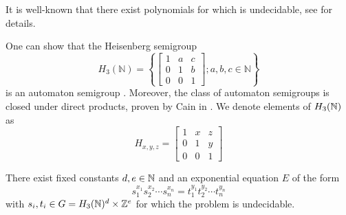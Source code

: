 \documentclass[11pt, titlepage]{article}
\begin{document}
It is well-known that there exist polynomials for which
 is undecidable, see \cite{Matiyasevich:hilbert} for
details.

One can show that the Heisenberg semigroup
\[
  H_3(\mathbb{N}) = \left\{
      \begin{bmatrix}
        1 & a & c \\
        0 & 1 & b \\
        0 & 0 & 1
      \end{bmatrix}; a, b, c \in \mathbb{N}
    \right\}
\]
is an automaton semigroup \cite{Bondarenko:heisenberg}. Moreover, the
class of automaton semigroups is closed under direct products, proven
by Cain in \cite{Cain09:auto_sg}. We denote elements of $H_3(\mathbb{N})$ as
\[
  H_{x,y,z} = 
      \begin{bmatrix}
        1 & x & z \\
        0 & 1 & y \\
        0 & 0 & 1
      \end{bmatrix}
\]

\begin{proposition}
  There exist fixed constants $d,e \in \mathbb{N}$ and an exponential
  equation $E$ of the form
  \[ s_1^{x_1} s_2^{x_2}\cdots s_n^{x_n} = t_1^{y_1} t_2^{y_2}\cdots
    t_n^{y_n} \] with $s_i, t_i \in G = H_3(\mathbb{N})^d \times \mathbb{Z}^e$ for which the
   problem is undecidable.
\end{proposition}
\end{document}
